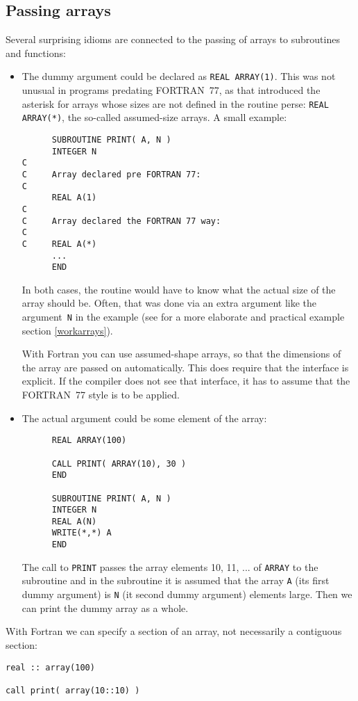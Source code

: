 \subsection{Passing arrays}
\label{passingarrays}
Several surprising idioms are connected to the passing of arrays to subroutines
and functions:
\begin{itemize}
\item
The dummy argument could be declared as \verb+REAL ARRAY(1)+. This was not
unusual in programs predating FORTRAN~77, as that introduced the asterisk for
arrays whose sizes are not defined in the routine perse: \verb+REAL ARRAY(*)+, the
so-called assumed-size arrays. A small example:
\begin{verbatim}
      SUBROUTINE PRINT( A, N )
      INTEGER N
C
C     Array declared pre FORTRAN 77:
C
      REAL A(1)
C
C     Array declared the FORTRAN 77 way:
C
C     REAL A(*)
      ...
      END
\end{verbatim}

In both cases, the routine would have to know what the actual size of the array
should be. Often, that was done via an extra argument like the argument~\verb+N+
in the example (see for a more elaborate and practical example section \ref{workarrays}).

With Fortran you can use assumed-shape arrays, so that the dimensions of the array
are passed on automatically. This does require that the interface is explicit. If the
compiler does not see that interface, it has to assume that the FORTRAN~77 style is
to be applied.

\item
The actual argument could be some element of the array:
\begin{verbatim}
      REAL ARRAY(100)

      CALL PRINT( ARRAY(10), 30 )
      END

      SUBROUTINE PRINT( A, N )
      INTEGER N
      REAL A(N)
      WRITE(*,*) A
      END
\end{verbatim}

The call to \verb+PRINT+ passes the array elements 10, 11, ... of \verb+ARRAY+ to the subroutine
and in the subroutine it is assumed that the array \verb+A+ (its first dummy argument)
is \verb+N+ (it second dummy argument) elements large. Then we can print the dummy array
as a whole.
\end{itemize}

With Fortran we can specify a section of an array, not necessarily a contiguous section:
\begin{verbatim}
real :: array(100)

call print( array(10::10) )
\end{verbatim}

